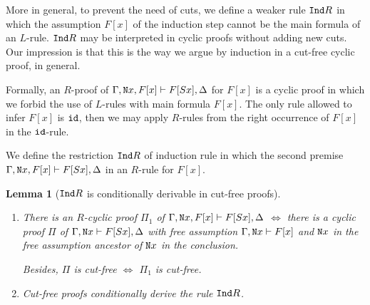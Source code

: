 \documentclass[a4paper,12pt]{article}
\newtheorem{lemma}[theorem]{Lemma}
\newcommand{\Nat}               { {\tt N}  }
\newcommand{\id}              { {\tt id} }
\newcommand{\Ind}            { {\tt Ind} }
\newcommand{\eqL}     {= \! \!  \!  L}
\begin{document}
More in general, to prevent the need of cuts, we define a weaker rule $\Ind R$ in which the assumption $F[x]$ of the induction step cannot be the main formula of an $L$-rule. $\Ind R$ may be interpreted in cyclic proofs without adding new cuts. Our impression is that this is the way we argue by induction in a cut-free cyclic proof, in general. 

Formally, an $R$-proof of $\Gamma, \Nat x, F[x] \vdash F[Sx], \Delta$ for $F[x]$ is a cyclic proof in which we forbid the use of $L$-rules with main formula $F[x]$. 
The only rule allowed to infer $F[x]$ is $\id$, then we may apply $R$-rules from the right occurrence of $F[x]$ in the $\id$-rule.

We define the restriction $\Ind R$ of induction rule  in which the second premise $\Gamma, \Nat x, F[x] \vdash F[Sx], \Delta$ in an $R$-rule for $F[x]$.  


\begin{lemma}[$\Ind R$ is conditionally derivable in cut-free proofs]
\label{lemma-ind-R}
\begin{enumerate}
\item
There is an $R$-cyclic proof $\Pi_1$ of  $\Gamma, \Nat x, F[x] \vdash F[Sx], \Delta$ $\Leftrightarrow$ there is a cyclic proof $\Pi$ of  $\Gamma, \Nat x \vdash F[Sx], \Delta$ with free assumption $\Gamma, \Nat x \vdash F[x]$ and $\Nat x$ in the free assumption ancestor of $\Nat x$ in the conclusion. 

Besides, $\Pi$ is cut-free $\Leftrightarrow$ $\Pi_1$ is cut-free. 
\item
Cut-free proofs conditionally derive the rule $\Ind R$.
\end{enumerate}
\end{lemma}
\end{document}
